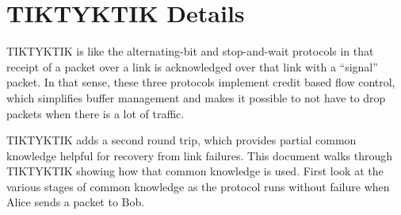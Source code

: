 \documentclass[../HFT-main.tex]{subfiles}
\begin{document}

\clearpage
\section{TIKTYKTIK Details} 


TIKTYKTIK is like the alternating-bit and stop-and-wait protocols in that receipt of a
packet over a link is acknowledged over that link with a “signal” packet. 
In that sense,
these three protocols implement credit based flow control, which simplifies buﬀer management and makes it possible to not have to drop packets when there is a lot of traﬃc.

TIKTYKTIK adds a second round trip, which provides partial common knowledge
helpful for recovery from link failures. This document walks through TIKTYKTIK
showing how that common knowledge is used.
First look at the various stages of common knowledge as the protocol runs without
failure when Alice sends a packet to Bob.
\end{document}
